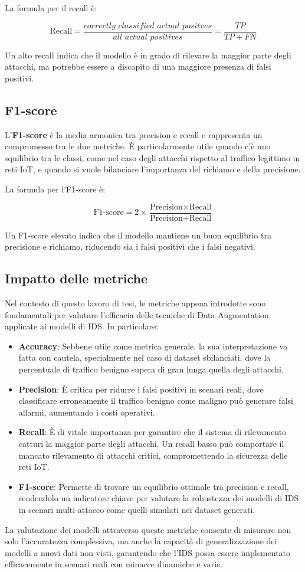 La formula per il recall è:

\[
\text{Recall} = \frac{\textit{correctly classified actual positves}}{\textit{all actual positives}}  = \frac{TP}{TP + FN}
\]

Un alto recall indica che il modello è in grado di rilevare la maggior parte degli attacchi, ma potrebbe essere a discapito di una maggiore presenza di falsi positivi.

\subsection{F1-score}

L'\textbf{F1-score} è la media armonica tra precision e recall e rappresenta un compromesso tra le due metriche. È particolarmente utile quando c'è uno squilibrio tra le classi, come nel caso degli attacchi rispetto al traffico legittimo in reti IoT, e quando si vuole bilanciare l'importanza del richiamo e della precisione.

La formula per l'F1-score è:

\[
\text{F1-score} = 2 \times \frac{\text{Precision} \times \text{Recall}}{\text{Precision} + \text{Recall}}
\]

Un F1-score elevato indica che il modello mantiene un buon equilibrio tra precisione e richiamo, riducendo sia i falsi positivi che i falsi negativi. \cite{metricsReference}

\subsection{Impatto delle metriche}

Nel contesto di questo lavoro di tesi, le metriche appena introdotte sono fondamentali per valutare l'efficacia delle tecniche di Data Augmentation applicate ai modelli di IDS. In particolare:
\begin{itemize}
    \item \textbf{Accuracy}: Sebbene utile come metrica generale, la sua interpretazione va fatta con cautela, specialmente nel caso di dataset sbilanciati, dove la percentuale di traffico benigno supera di gran lunga quella degli attacchi.
    \item \textbf{Precision}: È critica per ridurre i falsi positivi in scenari reali, dove classificare erroneamente il traffico benigno come maligno può generare falsi allarmi, aumentando i costi operativi.
    \item \textbf{Recall}: È di vitale importanza per garantire che il sistema di rilevamento catturi la maggior parte degli attacchi. Un recall basso può comportare il mancato rilevamento di attacchi critici, compromettendo la sicurezza delle reti IoT.
    \item \textbf{F1-score}: Permette di trovare un equilibrio ottimale tra precision e recall, rendendolo un indicatore chiave per valutare la robustezza dei modelli di IDS in scenari multi-attacco come quelli simulati nei dataset generati.
\end{itemize}

La valutazione dei modelli attraverso queste metriche consente di misurare non solo l'accuratezza complessiva, ma anche la capacità di generalizzazione dei modelli a nuovi dati non visti, garantendo che l'IDS possa essere implementato efficacemente in scenari reali con minacce dinamiche e varie.
